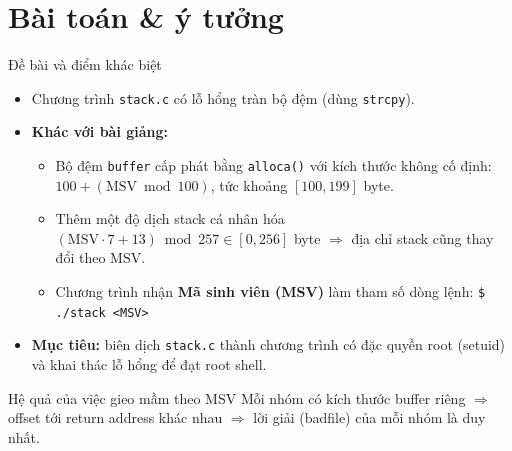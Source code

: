 \documentclass[aspectratio=169,10pt]{beamer}
\begin{document}
\section{Bài toán \& ý tưởng}
\begin{frame}{Đề bài và điểm khác biệt}
  \begin{itemize}
    \item Chương trình \texttt{stack.c} có lỗ hổng tràn bộ đệm (dùng \texttt{strcpy}).
    \item \textbf{Khác với bài giảng:}
      \begin{itemize}
        \item Bộ đệm \texttt{buffer} cấp phát bằng \texttt{alloca()} với kích thước
              \alert{không cố định}: $100 + (\text{MSV}\bmod 100)$, tức khoảng
              $[100, 199]$ byte.
        \item Thêm một \alert{độ dịch stack} cá nhân hóa $(\text{MSV}\cdot 7+13)\bmod 257
              \in [0,256]$ byte $\Rightarrow$ địa chỉ stack cũng thay đổi theo MSV.
        \item Chương trình nhận \textbf{Mã sinh viên (MSV)} làm tham số dòng lệnh:
              \texttt{\$ ./stack <MSV>}
      \end{itemize}
    \item \textbf{Mục tiêu:} biên dịch \texttt{stack.c} thành chương trình có
          đặc quyền root (setuid) và khai thác lỗ hổng để đạt \alert{root shell}.
  \end{itemize}
  \vfill
  \begin{block}{Hệ quả của việc gieo mầm theo MSV}
    Mỗi nhóm có kích thước buffer riêng $\Rightarrow$ offset tới return address
    khác nhau $\Rightarrow$ lời giải (badfile) của mỗi nhóm là duy nhất.
  \end{block}
\end{frame}

\end{document}

